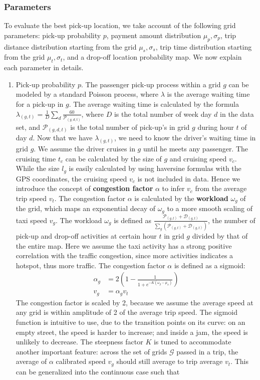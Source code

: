 \documentclass[letterpaper, 10 pt, conference]{ieeeconf}
\begin{document}
\subsubsection{Parameters}
To evaluate the best pick-up location, we take account of the following grid parameters: pick-up probability $p$, payment amount distribution $\mu_p, \sigma_p$, trip distance distribution starting from the grid $\mu_s, \sigma_s$, trip time distribution starting from the grid $\mu_t, \sigma_t$, and a drop-off location probability map. We now explain each parameter in details.
\begin{enumerate}
\item Pick-up probability $p$. The passenger pick-up process within a grid $g$ can be modeled by a standard Poisson process, where $\lambda$ is the average waiting time for a pick-up in $g$. The average waiting time is calculated by the formula $\lambda_{(g,t)} = \frac{1}{D}\sum_d\frac{60}{\mathcal{P}_{(g,d,t)}}$, where $D$ is the total number of week day $d$ in the data set, and $\mathcal{P}_{(g,d,t)}$ is the total number of pick-up's in grid $g$ during hour $t$ of day $d$. Now that we have $\lambda_{(g,t)}$, we need to know the driver's waiting time in grid $g$. We assume the driver cruises in $g$ until he meets any passenger. The cruising time $t_c$ can be calculated by the size of $g$ and cruising speed $v_c$. While the size $l_g$ is easily calculated by using haversine formulas with the GPS coordinates, the cruising speed $v_c$ is not included in data. Hence we introduce the concept of \textbf{congestion factor} $\alpha$ to infer $v_c$ from the average trip speed $v_t$. The congestion factor $\alpha$ is calculated by the \textbf{workload} $\omega_g$ of the grid, which maps an exponential decay of $\omega_g$ to a more smooth scaling of taxi speed $v_g$. The workload $\omega_g$ is defined as $\frac{\mathcal{P}_{(g,t)}+\mathcal{D}_{(g,t)}}{\sum_{g}(\mathcal{P}_{(g,t)}+\mathcal{D}_{(g,t)})}$, the number of pick-up and drop-off activities at certain hour $t$ in grid $g$ divided by that of the entire map. Here we assume the taxi activity has a strong positive correlation with the traffic congestion, since more activities indicates a hotspot, thus more traffic. The congestion factor $\alpha$ is defined as a sigmoid:
\begin{align}
\alpha_g &= 2(1-\frac{1}{1+e^{-K(\omega_g-\mu_\omega)}})\\
v_g &= \alpha_gv_t
\end{align}
The congestion factor is scaled by 2, because we assume the average speed at any grid is within amplitude of 2 of the average trip speed. The sigmoid function is intuitive to use, due to the transition points on its curve: on an empty street, the speed is harder to increase; and inside a jam, the speed is unlikely to decrease. The steepness factor $K$ is tuned to accommodate another important feature: across the set of grids $\mathcal{G}$ passed in a trip, the average of $\alpha$ calibrated speed $v_g$ should still average to trip average $v_t$. This can be generalized into the continuous case such that

\end{enumerate}
\end{document}

